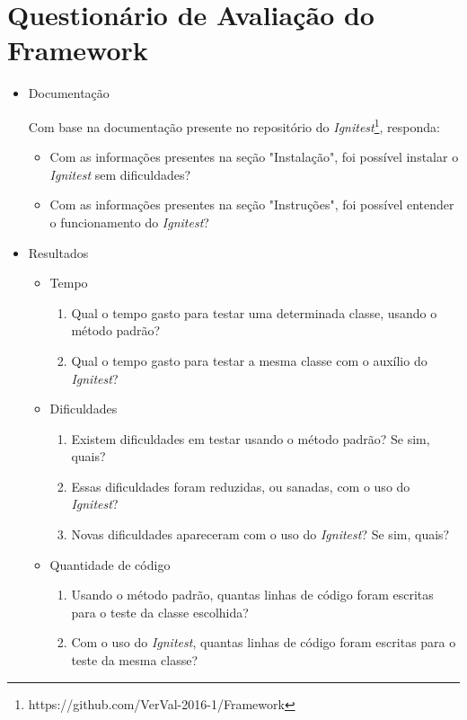 \chapter{Questionário de Avaliação do Framework}
\label{questionario}

  
    \begin{itemize}
        \item Documentação
        
            Com base na documentação presente no repositório do \textit{Ignitest}\footnote{https://github.com/VerVal-2016-1/Framework}, responda:
            \begin{itemize}
                \item Com as informações presentes na seção "Instalação", foi possível instalar o \textit{Ignitest} sem dificuldades?
                \item Com as informações presentes na seção "Instruções", foi possível entender o funcionamento do \textit{Ignitest}?
            \end{itemize}
            
        \item Resultados
            \begin{itemize}
                \item Tempo
                    \begin{enumerate}
                        \item Qual o tempo gasto para testar uma determinada classe, usando o método padrão?
                        \item Qual o tempo gasto para testar a mesma classe com o auxílio do \textit{Ignitest}?
                    \end{enumerate}
                \item Dificuldades
                    \begin{enumerate}
                        \item Existem dificuldades em testar usando o método padrão? Se sim, quais?
                        \item Essas dificuldades foram reduzidas, ou sanadas, com o uso do \textit{Ignitest}?
                        \item Novas dificuldades apareceram com o uso do \textit{Ignitest}? Se sim, quais?
                    \end{enumerate}
                \item Quantidade de código
                    \begin{enumerate}
                        \item Usando o método padrão, quantas linhas de código foram escritas para o teste da classe escolhida?
                        \item Com o uso do \textit{Ignitest}, quantas linhas de código foram escritas para o teste da mesma classe?
                    \end{enumerate}


\end{itemize}
\end{itemize}
